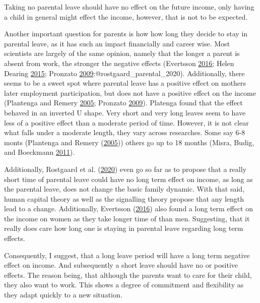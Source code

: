 \documentclass[
  12pt,
]{article}
\begin{document}
Taking no parental leave should have no effect on the future income, only having a child in general might effect the income, however, that is not to be expected.

Another important question for parents is how how long they decide to stay in parental leave, as it has such an impact financially and career wise.
Most scientists are largely of the same opinion, namely that the longer a parent is absent from work, the stronger the negative effects (Evertsson \protect\hyperlink{ref-evertsson_parental_2016}{2016}; Helen Dearing \protect\hyperlink{ref-helen_dearing_does_2015}{2015}; Pronzato \protect\hyperlink{ref-pronzato_return_2009}{2009}:@rostgaard\_parental\_2020). Additionally, there seems to be a sweet spot where parental leave has a positive effect on mothers later employment participation, but does not have a positive effect on the income (Plantenga and Remery \protect\hyperlink{ref-plantenga_reconciliation_2005}{2005}; Pronzato \protect\hyperlink{ref-pronzato_return_2009}{2009}). Platenga found that the effect behaved in an inverted U shape. Very short and very long leaves seem to have less of a positive effect than a moderate period of time.
However, it is not clear what falls under a moderate length, they vary across researches. Some say 6-8 monts (Plantenga and Remery (\protect\hyperlink{ref-plantenga_reconciliation_2005}{2005})) others go up to 18 months (Misra, Budig, and Boeckmann \protect\hyperlink{ref-misra_work-family_2011}{2011}).

Additionally, Rostgaard et al. (\protect\hyperlink{ref-rostgaard_parental_2020}{2020}) even go so far as to propose that a really short time of parental leave could have no long term effect on income, as long as the parental leave, does not change the basic family dynamic. With that said, human capital theory as well as the signalling theory propose that any length lead to a change. Additionally, Evertsson (\protect\hyperlink{ref-evertsson_parental_2016}{2016}) also found a long term effect on the income on women as they take longer time of than men. Suggesting, that it really does care how long one is staying in parental leave regarding long term effects.

Consequently, I suggest, that a long leave period will have a long term negative effect on income. And subsequently a short leave should have no or positive effects. The reason being, that although the parents want to care for their child, they also want to work. This shows a degree of commitment and flexibility as they adapt quickly to a new situation.
\end{document}
